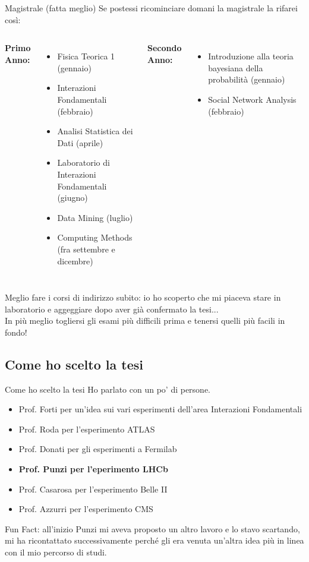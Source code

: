 \documentclass[
10pt,
aspectratio=169,
]{beamer}
\begin{document}
\begin{frame}[t]{Magistrale (fatta meglio)}
Se postessi ricominciare domani la magistrale la rifarei così:
\vfill
\begin{columns}[T]
    \textbf{Primo Anno:}
    \begin{itemize}
    \item Fisica Teorica 1 (gennaio)
    \item Interazioni Fondamentali (febbraio)
    \item Analisi Statistica dei Dati (aprile)
    \item Laboratorio di Interazioni Fondamentali (giugno)
    \item Data Mining (luglio)
    \item Computing Methods (fra settembre e dicembre)

    \end{itemize}
    \textbf{Secondo Anno:}
    \begin{itemize}
        \item Introduzione alla teoria bayesiana della probabilità (gennaio)
        \item Social Network Analysis (febbraio)
    \end{itemize}
\end{columns}
    \vfill
Meglio fare i corsi di indirizzo subito: io ho scoperto che mi piaceva stare in laboratorio e aggeggiare dopo aver già confermato la tesi... \\
In più meglio togliersi gli esami più difficili prima e tenersi quelli più facili in fondo!
    \end{frame}
\subsection{Come ho scelto la tesi}
\begin{frame}{Come ho scelto la tesi}
Ho parlato con un po' di persone.
\begin{itemize}
    \item Prof. Forti per un'idea sui vari esperimenti dell'area Interazioni Fondamentali
    \item Prof. Roda per l'esperimento ATLAS
    \item Prof. Donati per gli esperimenti a Fermilab
    \item \textbf{Prof. Punzi per l'eperimento LHCb}
    \item Prof. Casarosa per l'esperimento Belle II
    \item Prof. Azzurri per l'esperimento CMS
\end{itemize}
\vfill
Fun Fact: all'inizio Punzi mi aveva proposto un altro lavoro e lo stavo scartando, mi ha ricontattato successivamente perché gli era venuta un'altra idea più in linea con il mio percorso di studi.
\end{frame}
\end{document}
